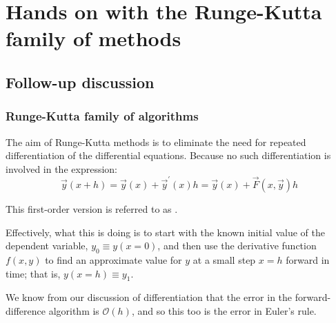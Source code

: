 \documentclass[hyperref={colorlinks=true}]{beamer}
\begin{document}
\section[Hands on with the Runge-Kutta family of methods]{Hands on with the Runge-Kutta family of methods}

\subsection[Follow-up discussion]{Follow-up discussion}

\begin{frame}%
  \frametitle{Runge-Kutta family of algorithms}

  The aim of Runge-Kutta methods is to eliminate the need for repeated differentiation of the differential equations. Because no such differentiation is involved in the  expression:
  \begin{equation}
    \vec{y}(x + h) = \vec{y}(x) + \vec{y}^{\prime}(x)h = \vec{y}(x) + \vec{F}(x, \vec{y})h
  \end{equation}
  
  This first-order version is referred to as .
  
  \mysp
  
  Effectively, what this is doing is to start with the known initial value of the dependent variable, $y_0 \equiv y(x = 0)$, and then use the derivative function $f(x,y)$ to find an approximate value for $y$ at a small step $x = h$ forward in time; that is, $y(x = h) \equiv y_1$. 
  
  \mysp
  
  We know from our discussion of differentiation that the error in the forward-difference algorithm is $\mathcal{O}(h)$, and so this too is the error in Euler's rule.
  
    \centering \Large {}

\end{frame}

\end{document}
